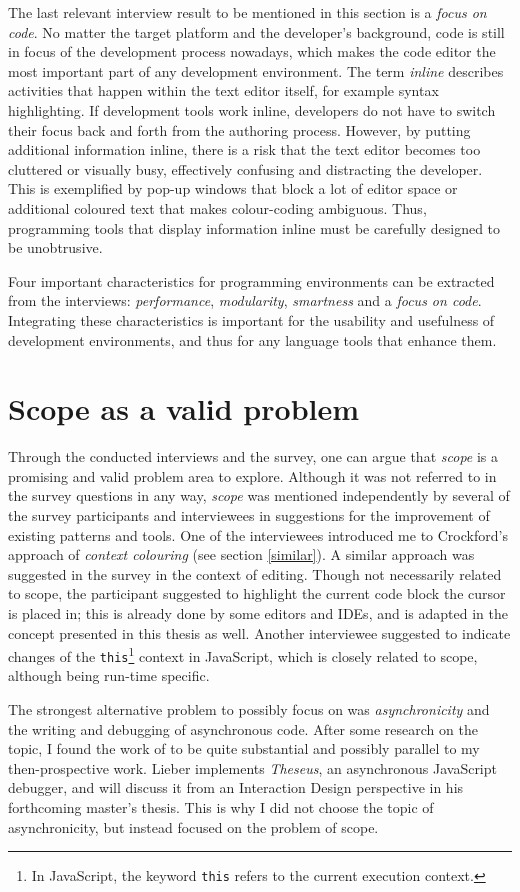 The last relevant interview result to be mentioned in this section is a
\emph{focus on code}. No matter the target platform and the developer’s
background, code is still in focus of the development process nowadays,
which makes the code editor the most important part of any development
environment. The term \emph{inline} describes activities that happen
within the text editor itself, for example syntax highlighting. If
development tools work inline, developers do not have to switch their
focus back and forth from the authoring process. However, by putting
additional information inline, there is a risk that the text editor
becomes too cluttered or visually busy, effectively confusing and
distracting the developer. This is exemplified by pop-up windows that
block a lot of editor space or additional coloured text that makes
colour-coding ambiguous. Thus, programming tools that display
information inline must be carefully designed to be unobtrusive.

Four important characteristics for programming environments can be
extracted from the interviews: \emph{performance}, \emph{modularity},
\emph{smartness} and a \emph{focus on code}. Integrating these
characteristics is important for the usability and usefulness of
development environments, and thus for any language tools that enhance
them.

\section{Scope as a valid problem}\label{scope-as-a-valid-problem}

Through the conducted interviews and the survey, one can argue that
\emph{scope} is a promising and valid problem area to explore. Although
it was not referred to in the survey questions in any way, \emph{scope}
was mentioned independently by several of the survey participants and
interviewees in suggestions for the improvement of existing patterns and
tools. One of the interviewees introduced me to Crockford’s
\citeyear{crockford} approach of \emph{context colouring} (see section
\ref{similar}). A similar approach was suggested in the survey in the
context of editing. Though not necessarily related to scope, the
participant suggested to highlight the current code block the cursor is
placed in; this is already done by some editors and IDEs, and is adapted
in the concept presented in this thesis as well. Another interviewee
suggested to indicate changes of the
\texttt{this}\footnote{In JavaScript, the keyword \texttt{\gls{this}} refers to the current execution context.}
context in JavaScript, which is closely related to scope, although being
run-time specific.

The strongest alternative problem to possibly focus on was
\emph{asynchronicity} and the writing and debugging of asynchronous
code. After some research on the topic, I found the work of
 to be quite substantial and possibly parallel to my
then-prospective work. Lieber implements \emph{Theseus}, an asynchronous
JavaScript debugger, and will discuss it from an Interaction Design
perspective in his forthcoming master’s thesis. This is why I did not
choose the topic of asynchronicity, but instead focused on the problem
of scope.
